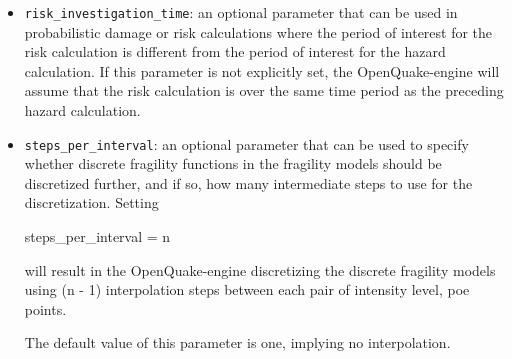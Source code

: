\begin{itemize}

  \item \Verb+risk_investigation_time+: an optional parameter that can be used
    in probabilistic damage or risk calculations where the period of interest
    for the risk calculation is different from the period of interest for the 
    hazard calculation. If this parameter is not explicitly set, the 
    OpenQuake-engine will assume that the risk calculation is over the same 
    time period as the preceding hazard calculation.

  \item \Verb+steps_per_interval+: an optional parameter that can be used to
    specify whether discrete fragility functions in the fragility models should
    be discretized further, and if so, how many intermediate steps to use for
    the discretization. Setting 

    steps\_per\_interval = n

    will result in the OpenQuake-engine discretizing the discrete fragility
    models using (n - 1) interpolation steps between each pair of 
    {intensity level, poe} points.

    The default value of this parameter is one, implying no interpolation.

\end{itemize}
